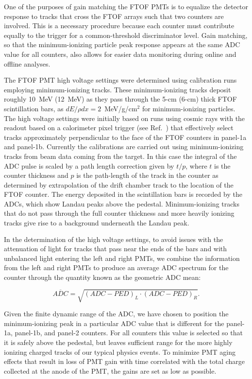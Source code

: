 \documentclass[final,3p,twocolumn]{elsarticle}
\begin{document}
One of the purposes of gain matching the FTOF PMTs is to equalize the detector response to tracks that
cross the FTOF arrays such that two counters are involved. This is a necessary procedure because each
counter must contribute equally to the trigger for a common-threshold discriminator level. Gain matching,
so that the minimum-ionizing particle peak response appears at the same ADC value for all counters, also
allows for easier data monitoring during online and offline analyses.

The FTOF PMT high voltage settings were determined using calibration runs employing minimum-ionizing
tracks. These minimum-ionizing tracks deposit roughly 10~MeV (12~MeV) as they pass through the 5-cm
(6-cm) thick FTOF scintillation bars, as $dE/\rho dx = 2$~MeV/g/cm$^2$ for minimum-ionizing particles.
The high voltage settings were initially based on runs using cosmic rays with the readout based on a
calorimeter pixel trigger (see Ref.~\cite{ec-nim}) that effectively select tracks approximately perpendicular
to the face of the FTOF counters in panel-1a and panel-1b. Currently the calibrations are carried out using
minimum-ionizing tracks from beam data coming from the target. In this case the integral of the ADC pulse
is scaled by a path length correction given by $t/p$, where $t$ is the counter thickness and $p$ is the
path-length of the track in the counter as determined by extrapolation of the drift chamber track to the
location of the FTOF counter. The energy deposited in the scintillation bars is recorded by the ADCs, 
which show Landau peaks above the pedestal. Minimum-ionizing tracks that do not pass through the full
counter thickness and more heavily ionizing tracks give rise to a background underneath the Landau peak.

In the determination of the high voltage settings, to avoid issues with the attenuation of light for tracks that
pass near the ends of the bars and with unbalanced light entering the left and right PMTs, we combine the
information from the left and right PMTs to produce an average ADC spectrum for the counter through the
quantity known as the geometric ADC mean:

\begin{equation}
\label{adc}
\overline{ADC} = \sqrt{ (ADC - PED)_L \cdot (ADC - PED)_R}.
\end{equation}

Given the finite dynamic range of the ADC, we have chosen to position the minimum-ionizing peak in a
particular ADC value that is different for the panel-1a, panel-1b, and panel-2 counters. For all counters
this value is selected so that it is safely above the pedestal, but leaves sufficient range for the more
highly ionizing charged tracks of our typical physics events. To minimize PMT aging effects that result in
loss of PMT gain with time correlated with the total charge collected at the anode of the PMT, the gains
are set as low as possible.
\end{document}
